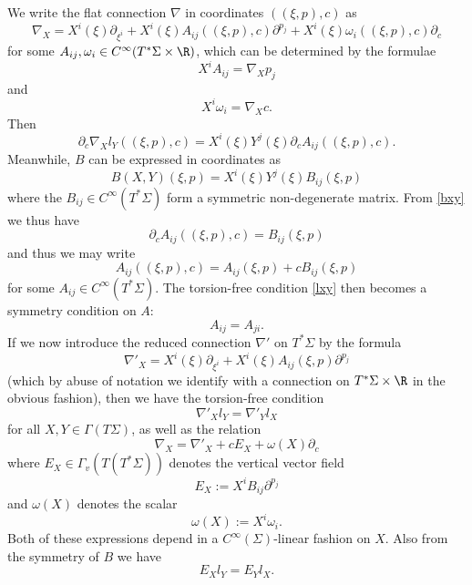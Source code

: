 \documentclass{article}
\numberwithin{equation}{section}
\theoremstyle{plain}
\begin{document}
We write the flat connection $\nabla$ in coordinates $((\xi,p),c)$ as
$$ \nabla_X = X^i(\xi) \partial_{\xi^i} + X^i(\xi) A_{ij}((\xi,p),c) \partial^{p_j} + X^i(\xi) \omega_i((\xi,p),c) \partial_c$$
for some $A_{ij}, \omega_i \in C^\infty(T^*\Sigma \times \R)$, which can be determined by the formulae
$$ X^i A_{ij} = \nabla_X p_j$$
and
$$ X^i \omega_i = \nabla_X c.$$
Then
$$ \partial_c \nabla_X l_Y((\xi,p),c) = X^i(\xi) Y^j(\xi) \partial_c A_{ij}((\xi,p),c).$$
Meanwhile, $B$ can be expressed in coordinates as
$$ B(X,Y)(\xi,p) = X^i(\xi) Y^j(\xi) B_{ij}(\xi,p)$$
where the $B_{ij} \in C^\infty(T^*\Sigma)$ form a symmetric non-degenerate matrix.  From \eqref{bxy} we thus have
$$ \partial_c A_{ij}((\xi,p),c) =B_{ij}(\xi,p)$$
and thus we may write
$$ A_{ij}((\xi,p),c) = A_{ij}(\xi,p) + c B_{ij}(\xi,p)$$
for some $A_{ij} \in C^\infty(T^*\Sigma)$.  The torsion-free condition \eqref{lxy} then becomes a symmetry condition on $A$:
$$ A_{ij} = A_{ji}.$$
If we now introduce the reduced connection $\nabla'$ on $T^* \Sigma$ by the formula
$$ \nabla'_X = X^i(\xi) \partial_{\xi^i} + X^i(\xi) A_{ij}(\xi,p) \partial^{p_j}$$
(which by abuse of notation we identify with a connection on $T^* \Sigma \times \R$ in the obvious fashion), then we have the torsion-free condition
\begin{equation}\label{torsionfree}
\nabla'_X l_Y = \nabla'_Y l_X
\end{equation}
for all $X,Y \in \Gamma(T\Sigma)$, as well as the relation
\begin{equation}\label{nablax}
    \nabla_X = \nabla'_X + c E_X + \omega(X) \partial_c
\end{equation}
where $E_X \in \Gamma_v(T(T^* \Sigma))$ denotes the vertical vector field
$$ E_X := X^i B_{ij} \partial^{p_j}$$
and $\omega(X)$ denotes the scalar
$$ \omega(X) := X^i \omega_i.$$
Both of these expressions depend in a $C^\infty(\Sigma)$-linear fashion on $X$. Also from the symmetry of $B$ we have
\begin{equation}\label{E-torsionfree}
E_X l_Y = E_Y l_X.
\end{equation}

\smallskip
\end{document}
